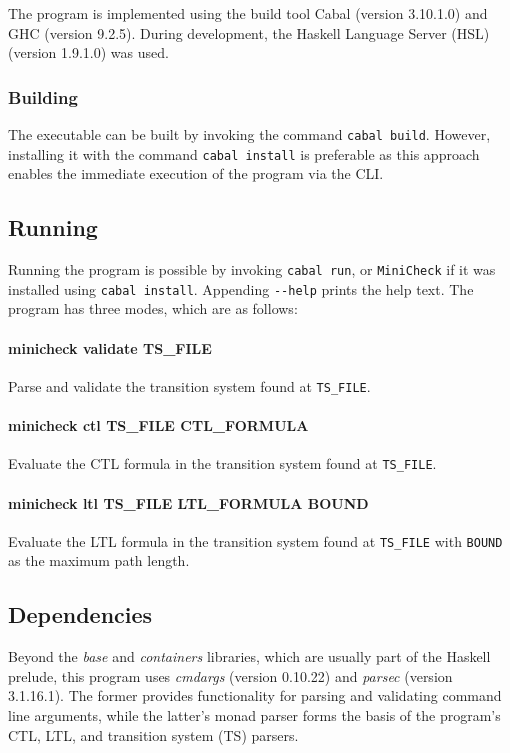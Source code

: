 \documentclass[11pt]{article}
\begin{document}
The program is implemented using the build tool Cabal (version 3.10.1.0) and GHC (version 9.2.5).
During development, the Haskell Language Server (HSL) (version 1.9.1.0) was used.

\subsubsection{Building}
The executable can be built by invoking the command \verb|cabal build|.
However, installing it with the command \verb|cabal install| is preferable as this approach enables the immediate execution of the program via the CLI.

\subsection{Running}
\label{subsec:dev:running}

Running the program is possible by invoking \verb|cabal run|, or \verb|MiniCheck| if it was installed using \verb|cabal install|.
Appending \verb|--help| prints the help text.
The program has three modes, which are as follows:

\paragraph{minicheck validate TS\_FILE}
Parse and validate the transition system found at \verb|TS_FILE|.

\paragraph{minicheck ctl TS\_FILE CTL\_FORMULA}
Evaluate the CTL formula in the transition system found at \verb|TS_FILE|.

\paragraph{minicheck ltl TS\_FILE LTL\_FORMULA BOUND}
Evaluate the LTL formula in the transition system found at \verb|TS_FILE| with \verb|BOUND| as the maximum path length.

\subsection{Dependencies}

Beyond the \textit{base} and \textit{containers} libraries, which are usually part of the Haskell prelude, this program uses \textit{cmdargs} (version 0.10.22) and \textit{parsec} (version 3.1.16.1).
The former provides functionality for parsing and validating command line arguments, while the latter's monad parser forms the basis of the program's CTL, LTL, and transition system (TS) parsers.
\end{document}
